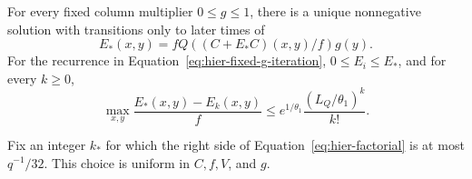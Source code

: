 \begin{lemma}
\label{lem:hier-fixed-point}
For every fixed column multiplier $0\leq g\leq1$, there is a unique
nonnegative solution with transitions only to later times of
\begin{equation}
 E_*(x,y)=fQ((C+E_*C)(x,y)/f)g(y).
 \label{eq:hier-fixed-point}
\end{equation}
For the recurrence in Equation~\eqref{eq:hier-fixed-g-iteration}, $0\leq E_i\leq E_*$, and for every $k\geq0$,
\begin{equation}
 \max_{x,y}\frac{E_*(x,y)-E_k(x,y)}f
 \leq
 e^{1/\theta_1}\frac{(L_Q/\theta_1)^k}{k!}.
 \label{eq:hier-factorial}
\end{equation}
\end{lemma}

Fix an integer $k_*$ for which the right side of
Equation~\eqref{eq:hier-factorial} is at most $q^{-1}/32$.
This choice is uniform in $C,f,V$, and $g$.

